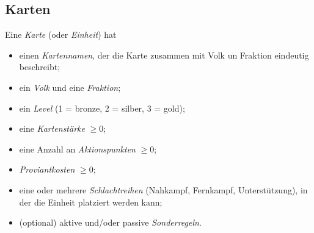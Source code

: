 \documentclass[a4paper,11pt]{report}
\begin{document}
\subsection{Karten}\label{ssec:Karten}
Eine \emph{Karte} (oder \emph{Einheit}) hat
\begin{itemize}
	\item einen \emph{Kartennamen}, der die Karte zusammen mit Volk un Fraktion eindeutig beschreibt;
	\item ein \emph{Volk} und eine \emph{Fraktion};%
	\item ein \emph{Level} (1 = bronze, 2 = silber, 3 = gold);%
	\item eine \emph{Kartenstärke} $\geq 0$;
	\item eine Anzahl an \emph{Aktionspunkten} $\geq 0$;
	\item \emph{Proviantkosten} $\geq 0$;
	\item eine oder mehrere \emph{Schlachtreihen} (Nahkampf, Fernkampf, Unterstützung), in der die Einheit platziert werden kann;
	\item (optional) aktive und/oder passive \emph{Sonderregeln}.
\end{itemize}
\end{document}
